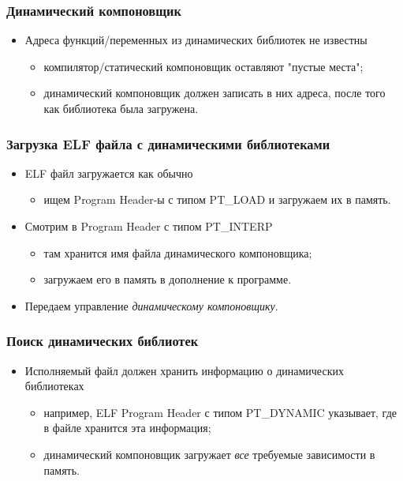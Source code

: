 \begin{frame}
\frametitle{Динамический компоновщик}
\begin{itemize}
    \item<1->Адреса функций/переменных из динамических библиотек не известны
    \begin{itemize}
        \item<2->компилятор/статический компоновщик оставляют "пустые места";
        \item<3->динамический компоновщик должен записать в них адреса,
             после того как библиотека была загружена.
    \end{itemize}
\end{itemize}
\end{frame}

\begin{frame}
\frametitle{Загрузка ELF файла с динамическими библиотеками}
\begin{itemize}
    \item<1->ELF файл загружается как обычно
    \begin{itemize}
        \item<2->ищем Program Header-ы с типом PT\_LOAD и
             загружаем их в память.
    \end{itemize}
    \item<3->Смотрим в Program Header с типом PT\_INTERP
    \begin{itemize}
        \item<4->там хранится имя файла динамического компоновщика;
        \item<5->загружаем его в память в дополнение к программе.
    \end{itemize}
    \item<6->Передаем управление \emph{динамическому компоновщику}.
\end{itemize}
\end{frame}

\begin{frame}
\frametitle{Поиск динамических библиотек}
\begin{itemize}
    \item<1->Исполняемый файл должен хранить информацию о динамических
         библиотеках
    \begin{itemize}
        \item<2->например, ELF Program Header с типом PT\_DYNAMIC указывает,
             где в файле хранится эта информация;
        \item<3->динамический компоновщик загружает \emph{все} требуемые
             зависимости в память.
    \end{itemize}
\end{itemize}
\end{frame}

